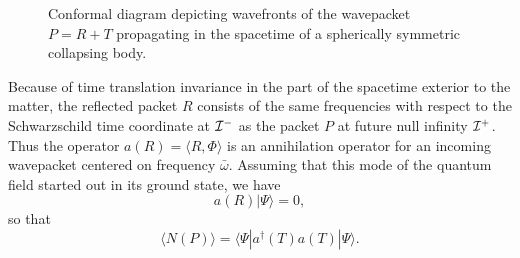 \documentclass[12pt]{article}
\def\obar{\bar{\omega}}
\def\la{\langle}
\def\ra{\rangle}
\def\pastI{{\cal I}^-}
\def\futI{{\cal I}^+}
\begin{document}
\begin{figure}[ht]
\caption{ Conformal diagram depicting wavefronts of the
wavepacket $P=R+T$ propagating in the spacetime of a
spherically symmetric collapsing body.}
\end{figure}

Because of time translation invariance in the part of the
spacetime exterior to the matter, the reflected packet $R$
consists of the same frequencies with respect to
the Schwarzschild time
coordinate at $\pastI$ as the packet $P$ at future null
infinity $\futI$. Thus the operator
$a(R)=\langle R,\Phi\rangle$ is an annihilation operator
for an incoming wavepacket centered on frequency $\obar$.
Assuming that this mode of
the quantum field started out in its ground state, we have
\begin{equation} a(R)|\Psi\ra =0,
\end{equation}
so that
\begin{equation} \la N(P)\ra =\la\Psi|a^{\dagger}(T)a(T)|\Psi\ra.
\label{2.6}
\end{equation}
\end{document}

